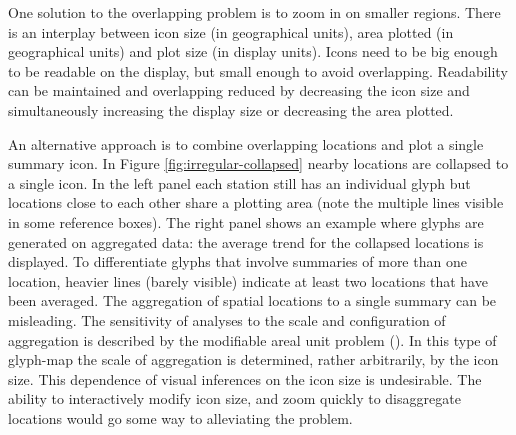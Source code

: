 \documentclass[oneside]{article}
\begin{document}
One solution to the overlapping problem is to zoom in on smaller regions. There is an interplay between icon size (in geographical units), area plotted (in geographical units) and plot size (in display units).  Icons need to be big enough to be readable on the display, but small enough to avoid overlapping.  Readability can be maintained and overlapping reduced by decreasing the icon size and simultaneously increasing the display size or decreasing the area plotted.

An alternative approach is to combine overlapping locations and plot a single summary icon.  In Figure \ref{fig:irregular-collapsed} nearby locations are collapsed to a single icon.  In the left panel each station still has an individual glyph but locations close to each other share a plotting area (note the multiple lines visible in some reference boxes). The right panel shows an example where glyphs are generated on aggregated data: the average trend for the collapsed locations is displayed.  To differentiate glyphs that involve summaries of more than one location, heavier lines (barely visible) indicate at least two locations that have been averaged.  The aggregation of spatial locations to a single summary can be misleading.  The sensitivity of analyses to the scale and configuration of aggregation is described by the  modifiable areal unit problem (\cite{Openshaw:1984kx, Fotheringham:1991uq}). In this type of glyph-map the scale of aggregation is determined, rather arbitrarily, by the icon size. This dependence of visual inferences on the icon size is undesirable.  The ability to interactively modify icon size, and zoom quickly to disaggregate locations would go some way to alleviating the problem.
\end{document}
